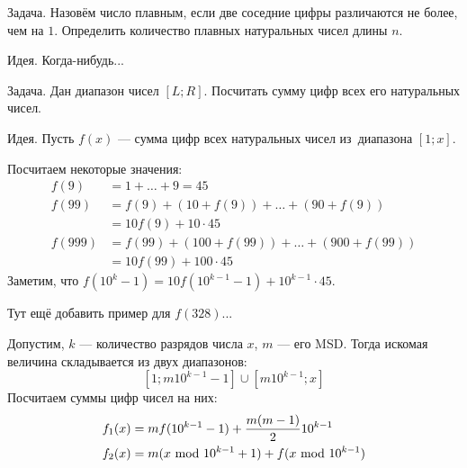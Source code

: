\begin{theorem}
{\bold Задача.} Назовём число {\ital плавным}, если две соседние цифры различаются не более, чем на $1$. Определить количество плавных натуральных чисел длины $n$.
\end{theorem}

{\bold Идея.} Когда-нибудь...

\begin{theorem}
{\bold Задача.} Дан диапазон чисел $[L;R]$. Посчитать сумму {\ital цифр} всех его натуральных чисел.
\end{theorem}

{\bold Идея.} Пусть $f(x)$ --- сумма цифр всех натуральных чисел из~диапазона $[1;x]$.

Посчитаем некоторые значения:
$$\begin{aligned}
f(9)&=1+\dots+9=45\\
f(99)&=f(9)+(10+f(9))+\dots+(90+f(9))\\
&=10f(9)+10\cdot 45\\
f(999)&=f(99)+(100+f(99))+\dots+(900+f(99))\\
&=10f(99)+100\cdot 45
\end{aligned}$$ 
Заметим, что $f(10^k-1)=10f(10^{k-1}-1)+10^{k-1}\cdot 45$.

Тут ещё добавить пример для $f(328)$...

Допустим, $k$ --- количество разрядов числа $x$, $m$ --- его {\ital MSD}. Тогда искомая величина складывается из двух диапазонов:
$$[1;m10^{k-1}-1]\cup[m10^{k-1};x]$$
Посчитаем суммы цифр чисел на них:
$$\begin{aligned}
f_1(x)&=mf(10^{k-1}-1)+\frac{m(m-1)}{2}10^{k-1}\\
f_2(x)&=m(x\ \mathrm{mod}\ 10^{k-1}+1)+f(x\ \mathrm{mod}\ 10^{k-1})
\end{aligned}$$
